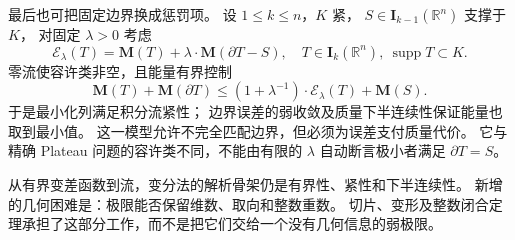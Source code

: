 \ProseParagraphBreak

最后也可把固定边界换成惩罚项。
设 \(1\leq k\leq n\)，\(K\) 紧，
\(S\in\mathbf I_{k-1}(\mathbb R^n)\) 支撑于 \(K\)，
对固定 \(\lambda>0\) 考虑
\[
 \mathcal E_\lambda(T)=\mathbf M(T)+\lambda\cdot\mathbf M(\partial T-S),
 \quad T\in\mathbf I_k(\mathbb R^n),\
                 \operatorname{supp}T\subset K.
\]
零流使容许类非空，且能量有界控制
\[
 \mathbf M(T)+\mathbf M(\partial T)
 \leq (1+\lambda^{-1})\cdot\mathcal E_\lambda(T)+\mathbf M(S).
\]
于是最小化列满足积分流紧性；
边界误差的弱收敛及质量下半连续性保证能量也取到最小值。
这一模型允许不完全匹配边界，但必须为误差支付质量代价。
它与精确 Plateau 问题的容许类不同，不能由有限的 \(\lambda\) 自动断言极小者满足
\(\partial T=S\)。

\ProseParagraphBreak

从有界变差函数到流，变分法的解析骨架仍是有界性、紧性和下半连续性。
新增的几何困难是：极限能否保留维数、取向和整数重数。
切片、变形及整数闭合定理承担了这部分工作，而不是把它们交给一个没有几何信息的弱极限。
